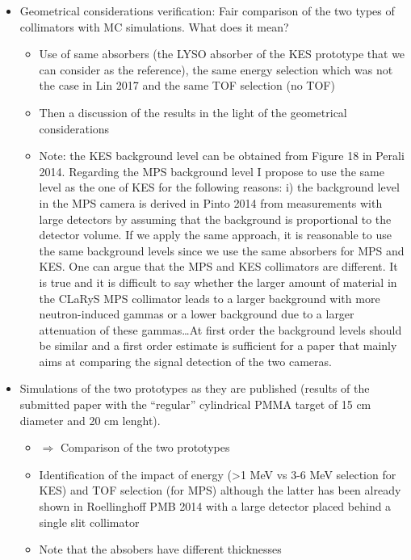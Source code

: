 \documentclass[a4paper,english]{article}
\begin{document}
\begin{itemize}
  \item Geometrical considerations verification: Fair comparison of the two types of collimators with MC simulations. What does it mean? 
  \begin{itemize}
    \item Use of same absorbers (the LYSO absorber of the KES prototype that we can consider as the reference), the same energy selection which was not the case in Lin 2017 and the same TOF selection (no TOF)
    \item Then a discussion of the results in the light of the geometrical considerations
    \item Note: the KES background level can be obtained from Figure 18 in Perali 2014. Regarding the MPS background level I propose to use the same level as the one of KES for the following reasons: i) the background level in the MPS camera is derived in Pinto 2014 from measurements with large detectors by assuming that the background is proportional to the detector volume. If we apply the same approach, it is reasonable to use the same background levels since we use the same absorbers for MPS and KES. One can argue that the MPS and KES collimators are different. It is true and it is difficult to say whether the larger amount of material in the CLaRyS MPS collimator leads to a larger background with more neutron-induced gammas or a lower background due to a larger attenuation of these gammas\dots At first order the background levels should be similar and a first order estimate is sufficient for a paper that mainly aims at comparing the signal detection of the two cameras.
  \end{itemize}    
  \item Simulations of the two prototypes as they are published (results of the submitted paper with the \enquote{regular} cylindrical PMMA target of 15 cm diameter and 20 cm lenght). 
  \begin{itemize}
    \item $\Rightarrow$ Comparison of the two prototypes
    \item Identification of the impact of energy (>1 MeV vs 3-6 MeV selection for KES) and TOF selection (for MPS) although the latter has been already shown in Roellinghoff PMB 2014 with a large detector placed behind a single slit collimator
    \item Note that the absobers have different thicknesses
  \end{itemize}     
\end{itemize}
\end{document}
